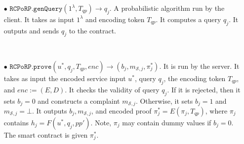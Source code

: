 \begin{definition}
\begin{itemize}
\


\item[$\bullet$] $\mathtt{RCPoRP}.\mathtt{genQuery}(1^\lambda, T_{\scriptscriptstyle qp})\rightarrow q_{\scriptscriptstyle j}$. A probabilistic algorithm run by the client. It takes as input  $1^\lambda$ and  encoding token $T_{\scriptscriptstyle qp}$.  It computes a query $q_{\scriptscriptstyle j}$. It outputs and sends $q_{\scriptscriptstyle j}$ to the contract. 





\


\item[$\bullet$] $\mathtt{RCPoRP}.\mathtt{prove}(u^{\scriptscriptstyle *},   q_{\scriptscriptstyle j},T_{\scriptscriptstyle qp},enc)\rightarrow (b_{\scriptscriptstyle j},m_{\scriptscriptstyle \mathcal{S},j},\pi^{\scriptscriptstyle *}_{\scriptscriptstyle j})$. It is run by the server. It  takes as input the encoded service input $u^{\scriptscriptstyle *}$,     query $q_{\scriptscriptstyle j}$,    the encoding token $T_{\scriptscriptstyle qp}$, and $enc:=(E,D)$.   It checks the validity of  query $q_{\scriptscriptstyle j}$.  If it is rejected, then it sets $b_{\scriptscriptstyle j}=0$ and constructs a complaint $m_{\scriptscriptstyle \mathcal{S},j}$. Otherwise,  it   sets $b_{\scriptscriptstyle j}=1$ and $m_{\scriptscriptstyle \mathcal{S},j}=\bot$. It outputs $b_{\scriptscriptstyle j},m_{\scriptscriptstyle \mathcal{S},j}$,   and  encoded proof $\pi^{\scriptscriptstyle *}_{\scriptscriptstyle j}=E(\pi_{\scriptscriptstyle j},T_{\scriptscriptstyle qp})$, where  $\pi_{\scriptscriptstyle j}$ contains $h_{\scriptscriptstyle j}=F(u^{\scriptscriptstyle *},q_{\scriptscriptstyle j},{pp'})$. Note,   $\pi_{\scriptscriptstyle j}$ may contain dummy values if $b_{\scriptscriptstyle j}=0$. The smart contract is given $\pi^{\scriptscriptstyle *}_{\scriptscriptstyle j}$.




\end{itemize}
\end{definition}
